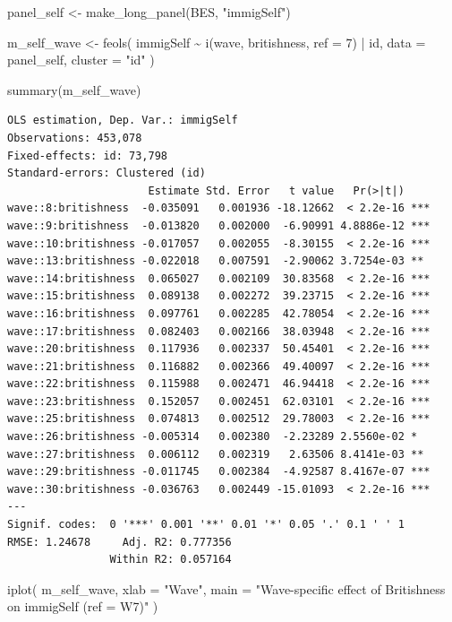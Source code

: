 \documentclass[
  11pt,
  letterpaper,
  DIV=11,
  numbers=noendperiod]{scrartcl}
\newenvironment{Shaded}{\begin{snugshade}}{\end{snugshade}}
\newcommand{\AttributeTok}[1]{\textcolor[rgb]{0.40,0.45,0.13}{#1}}
\newcommand{\DecValTok}[1]{\textcolor[rgb]{0.68,0.00,0.00}{#1}}
\newcommand{\FunctionTok}[1]{\textcolor[rgb]{0.28,0.35,0.67}{#1}}
\newcommand{\NormalTok}[1]{\textcolor[rgb]{0.00,0.23,0.31}{#1}}
\newcommand{\OtherTok}[1]{\textcolor[rgb]{0.00,0.23,0.31}{#1}}
\newcommand{\SpecialCharTok}[1]{\textcolor[rgb]{0.37,0.37,0.37}{#1}}
\newcommand{\StringTok}[1]{\textcolor[rgb]{0.13,0.47,0.30}{#1}}
\begin{document}
\begin{Shaded}
\begin{Highlighting}[]
\NormalTok{panel\_self }\OtherTok{\textless{}{-}} \FunctionTok{make\_long\_panel}\NormalTok{(BES, }\StringTok{"immigSelf"}\NormalTok{)}

\NormalTok{m\_self\_wave }\OtherTok{\textless{}{-}} \FunctionTok{feols}\NormalTok{(}
\NormalTok{  immigSelf }\SpecialCharTok{\textasciitilde{}} \FunctionTok{i}\NormalTok{(wave, britishness, }\AttributeTok{ref =} \DecValTok{7}\NormalTok{) }\SpecialCharTok{|}\NormalTok{ id,}
  \AttributeTok{data =}\NormalTok{ panel\_self,}
  \AttributeTok{cluster =} \StringTok{"id"}
\NormalTok{)}

\FunctionTok{summary}\NormalTok{(m\_self\_wave)}
\end{Highlighting}
\end{Shaded}

\begin{verbatim}
OLS estimation, Dep. Var.: immigSelf
Observations: 453,078
Fixed-effects: id: 73,798
Standard-errors: Clustered (id) 
                      Estimate Std. Error   t value   Pr(>|t|)    
wave::8:britishness  -0.035091   0.001936 -18.12662  < 2.2e-16 ***
wave::9:britishness  -0.013820   0.002000  -6.90991 4.8886e-12 ***
wave::10:britishness -0.017057   0.002055  -8.30155  < 2.2e-16 ***
wave::13:britishness -0.022018   0.007591  -2.90062 3.7254e-03 ** 
wave::14:britishness  0.065027   0.002109  30.83568  < 2.2e-16 ***
wave::15:britishness  0.089138   0.002272  39.23715  < 2.2e-16 ***
wave::16:britishness  0.097761   0.002285  42.78054  < 2.2e-16 ***
wave::17:britishness  0.082403   0.002166  38.03948  < 2.2e-16 ***
wave::20:britishness  0.117936   0.002337  50.45401  < 2.2e-16 ***
wave::21:britishness  0.116882   0.002366  49.40097  < 2.2e-16 ***
wave::22:britishness  0.115988   0.002471  46.94418  < 2.2e-16 ***
wave::23:britishness  0.152057   0.002451  62.03101  < 2.2e-16 ***
wave::25:britishness  0.074813   0.002512  29.78003  < 2.2e-16 ***
wave::26:britishness -0.005314   0.002380  -2.23289 2.5560e-02 *  
wave::27:britishness  0.006112   0.002319   2.63506 8.4141e-03 ** 
wave::29:britishness -0.011745   0.002384  -4.92587 8.4167e-07 ***
wave::30:britishness -0.036763   0.002449 -15.01093  < 2.2e-16 ***
---
Signif. codes:  0 '***' 0.001 '**' 0.01 '*' 0.05 '.' 0.1 ' ' 1
RMSE: 1.24678     Adj. R2: 0.777356
                Within R2: 0.057164
\end{verbatim}

\begin{Shaded}
\begin{Highlighting}[]
\FunctionTok{iplot}\NormalTok{(}
\NormalTok{  m\_self\_wave,}
  \AttributeTok{xlab =} \StringTok{"Wave"}\NormalTok{,}
  \AttributeTok{main =} \StringTok{"Wave{-}specific effect of Britishness on immigSelf (ref = W7)"}
\NormalTok{)}
\end{Highlighting}
\end{Shaded}
\end{document}

